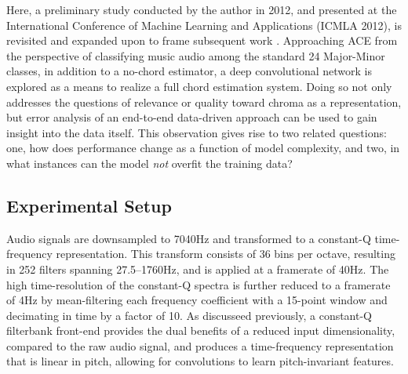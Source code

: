 Here, a preliminary study conducted by the author in 2012, and presented at the International Conference of Machine Learning and Applications (ICMLA 2012), is revisited and expanded upon to frame subsequent work \cite{Humphrey2012}.
Approaching ACE from the perspective of classifying music audio among the standard 24 Major-Minor classes, in addition to a no-chord estimator, a deep convolutional network is explored as a means to realize a full chord estimation system.
Doing so not only addresses the questions of relevance or quality toward chroma as a representation, but error analysis of an end-to-end data-driven approach can be used to gain insight into the data itself.
This observation gives rise to two related questions: one, how does performance change as a function of model complexity, and two, in what instances can the model \emph{not} overfit the training data?


\subsection{Experimental Setup}
\label{subsec:experimental_setup}

Audio signals are downsampled to 7040Hz and transformed to a constant-Q time-frequency representation.
This transform consists of 36 bins per octave, resulting in 252 filters spanning 27.5--1760Hz, and is applied at a framerate of 40Hz.
The high time-resolution of the constant-Q spectra is further reduced to a framerate of 4Hz by mean-filtering each frequency coefficient with a 15-point window and decimating in time by a factor of 10.
As discusseed previously, a constant-Q filterbank front-end provides the dual benefits of a reduced input dimensionality, compared to the raw audio signal, and produces a time-frequency representation that is linear in pitch, allowing for convolutions to learn pitch-invariant features.

